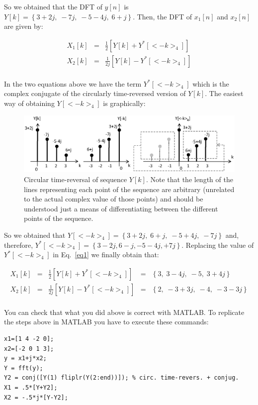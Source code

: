 \documentclass[a4paper,11pt,oneside]{article}
\begin{document}
So we obtained that the DFT of $y[n]$ is $Y[k]=\left\{3+2j,\;-7j,\;-5-4j,\;6+j\right\}$. Then, the DFT of $x_1[n]$ and $x_2[n]$ are given by:

\begin{equation}\label{eq1}
\begin{array}{lll}
X_1[k] &=& \frac{1}{2}\left[Y[k]+Y^*[<-k>_{4}]\right]\\
X_2[k] &=& \frac{1}{2j}\left[Y[k]-Y^*[<-k>_{4}]\right]\\
\end{array}
\end{equation}

In the two equations above we have the term $Y^*[<-k>_{4}]$ which is the complex conjugate of the circularly time-reversed version of $Y[k]$. The easiest way of obtaining $Y[<-k>_{4}]$ is graphically:

\begin{figure}[h!]
\centering
\includegraphics[width=\textwidth]{fig1.eps}
\caption{Circular time-reversal of sequence $Y[k]$. Note that the length of the lines representing each point of the sequence are arbitrary (unrelated to the actual complex value of those points) and should be understood just a means of differentiating between the different points of the sequence.}
\label{fig1}
\end{figure} 

So we obtained that $Y[<-k>_{4}]=\left\{3+2j,\;6+j,\;-5+4j,\;-7j\right\}$ and, therefore, $Y^*[<-k>_{4}]=\left\{3-2j,6-j,-5-4j,+7j\right\}$. Replacing the value of $Y^*[<-k>_{4}]$ in Eq.~\ref{eq1} we finally obtain that:

\[
\begin{array}{lllll}
X_1[k] &=& \frac{1}{2}\left[Y[k]+Y^*[<-k>_{4}]\right]&=&\left\{3,\;3-4j,\;-5,\;3+4j\right\}\\
X_2[k] &=& \frac{1}{2j}\left[Y[k]-Y^*[<-k>_{4}]\right]&=&\left\{2,\; -3+3j,\;-4,\;-3-3j\right\}\\
\end{array}
\]

You can check that what you did above is correct with MATLAB. To replicate the steps above in MATLAB you have to execute these commands:
\begin{verbatim}
x1=[1 4 -2 0];
x2=[-2 0 1 3];
y = x1+j*x2;
Y = fft(y);
Y2 = conj([Y(1) fliplr(Y(2:end))]); % circ. time-revers. + conjug.
X1 = .5*[Y+Y2];
X2 = -.5*j*[Y-Y2];
\end{verbatim}
\end{document}
